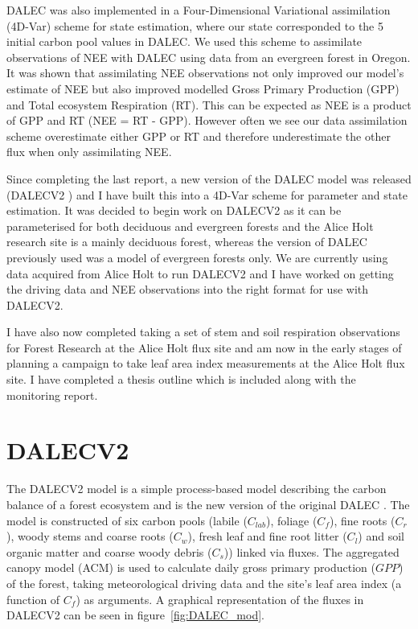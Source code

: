 \documentclass[11pt]{article}
\begin{document}
DALEC was also implemented in a Four-Dimensional Variational assimilation (4D-Var) scheme for state estimation, where our state corresponded to the 5 initial carbon pool values in DALEC. We used this scheme to assimilate observations of NEE with DALEC using data from an evergreen forest in Oregon. It was shown that assimilating NEE observations not only improved our model's estimate of NEE but also improved modelled Gross Primary Production (GPP) and Total ecosystem Respiration (RT). This can be expected as NEE is a product of GPP and RT (NEE = RT - GPP). However often we see our data assimilation scheme overestimate either GPP or RT and therefore underestimate the other flux when only assimilating NEE. 

Since completing the last report, a new version of the DALEC model was released (DALECV2 \citep{Bloom2014}) and I have built this into a 4D-Var scheme for parameter and state estimation. It was decided to begin work on DALECV2 as it can be parameterised for both deciduous and evergreen forests and the Alice Holt research site is a mainly deciduous forest, whereas the version of DALEC previously used was a model of evergreen forests only. We are currently using data acquired from Alice Holt to run DALECV2 and I have worked on getting the driving data and NEE observations into the right format for use with DALECV2.

I have also now completed taking a set of stem and soil respiration observations for Forest Research at the Alice Holt flux site and am now in the early stages of planning a campaign to take leaf area index measurements at the Alice Holt flux site. I have completed a thesis outline which is included along with the monitoring report.            

\section{DALECV2}

The DALECV2 model is a simple process-based model describing the carbon balance of a forest ecosystem \citep{Bloom2014} and is the new version of the original DALEC \citep{williams2005improved}. The model is constructed of six carbon pools (labile ($C_{lab}$), foliage ($C_f$), fine roots ($C_r$), woody stems and coarse roots ($C_w$), fresh leaf and fine root litter ($C_l$) and soil organic matter and coarse woody debris ($C_s$)) linked via fluxes. The aggregated canopy model (ACM) \citep{williams1997predicting} is used to calculate daily gross primary production ($GPP$) of the forest, taking meteorological driving data and the site's leaf area index (a function of $C_f$) as arguments. A graphical representation of the fluxes in DALECV2 can be seen in figure~\ref{fig:DALEC_mod}.   
\end{document}
